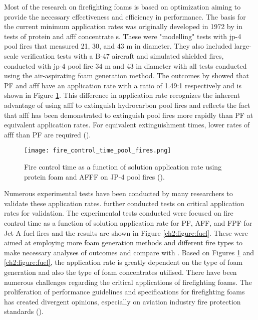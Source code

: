 Most of the research on firefighting foams is based on optimization aiming to provide the necessary effectiveness and efficiency in performance. The basis for the current minimum application rates was originally developed in 1972 by \cite{geyer1972evaluation} in tests of protein and \acrshort{afff} concentrate s. These were "modelling" tests with \acrfull{jp-4} pool fires that measured 21, 30, and 43 m in diameter. They also included large-scale verification tests with a B-47 aircraft and simulated shielded fires, conducted with \acrshort{jp-4} pool fire 34 m and 43 in diameter with all tests conducted using the air-aspirating foam generation method. The outcomes by \cite{geyer1972evaluation} showed that PF and \acrshort{afff} have an application rate with a ratio of 1.49:1 respectively and is shown in Figure \ref{ch2:figure:pool}. This difference in application rate recognizes the inherent advantage of using \acrshort{afff} to extinguish hydrocarbon pool fires and reflects the fact that \acrshort{afff} has been demonstrated to extinguish pool fires more rapidly than PF at equivalent application rates. For equivalent extinguishment times, lower rates of \acrshort{afff} than PF are required (\cite{scheffey1995evaluating}).

\begin{figure}[H]
    \centering
    \texttt{[image: fire\_control\_time\_pool\_fires.png]}
    \caption{Fire control time as a function of solution application rate using protein foam and AFFF on JP-4 pool fires (\cite{geyer1972evaluation}).}
    \label{ch2:figure:pool}
\end{figure}

Numerous experimental tests have been conducted by many researchers to validate these application rates. \cite{geyer1979comparative} further conducted tests on critical application rates for validation. The experimental tests conducted were focused on fire control time as a function of solution application rate for PF, AFF, and FPF for Jet A fuel fires and the results are shown in Figure \ref{ch2:figure:fuel}. These were aimed at employing more foam generation methods and different fire types to make necessary analyses of outcomes and compare with \cite{geyer1972evaluation}. Based on Figures \ref{ch2:figure:pool} and \ref{ch2:figure:fuel}, the application rate is greatly dependent on the type of foam generation and also the type of foam concentrates utilised. There have been numerous challenges regarding the critical applications of firefighting foams. The proliferation of performance guidelines and specifications for firefighting foams has created divergent opinions, especially on aviation industry fire protection standards (\cite{scheffey1995evaluating}).

